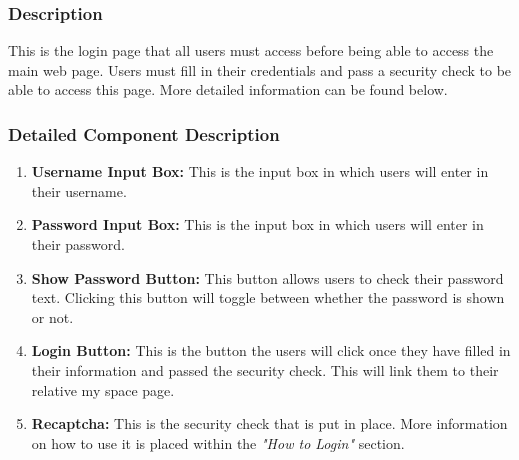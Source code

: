 \documentclass[14pt, a4paper]{article}
\begin{document}
	\subsubsection{Description}
		This is the login page that all users must access before being able to access the main web page. Users must fill in their credentials and pass a security check to be able to access this page. More detailed information can be found below.
	\subsubsection{Detailed Component Description}
		\begin{enumerate}
			\item \textbf{Username Input Box:} This is the input box in which users will enter in their username.
			\item \textbf{Password Input Box:} This is the input box in which users will enter in their password.
			\item \textbf{Show Password Button:} This button allows users to check their password text. Clicking this button will toggle between whether the password is shown or not.
			\item \textbf{Login Button:} This is the button the users will click once they have filled in their information and passed the security check. This will link them to their relative my space page.
			\item \textbf{Recaptcha: } This is the security check that is put in place. More information on how to use it is placed within the \textit{"How to Login"} section.
		\end{enumerate}
\end{document}
